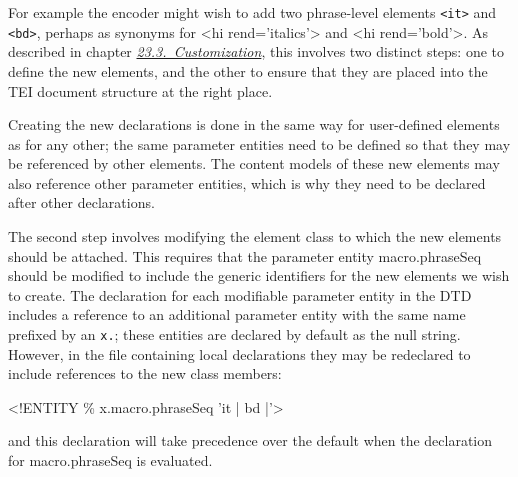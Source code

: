 For example the encoder might wish to add two phrase-level elements \texttt{<it>} and \texttt{<bd>}, perhaps as synonyms for <hi rend='italics'> and <hi rend='bold'>. As described in chapter \textit{\hyperref[MD]{23.3.\ Customization}}, this involves two distinct steps: one to define the new elements, and the other to ensure that they are placed into the TEI document structure at the right place.\par
Creating the new declarations is done in the same way for user-defined elements as for any other; the same parameter entities need to be defined so that they may be referenced by other elements. The content models of these new elements may also reference other parameter entities, which is why they need to be declared after other declarations. \par
The second step involves modifying the element class to which the new elements should be attached. This requires that the parameter entity \textsf{macro.phraseSeq} should be modified to include the generic identifiers for the new elements we wish to create. The declaration for each modifiable parameter entity in the DTD includes a reference to an additional parameter entity with the same name prefixed by an \texttt{x.}; these entities are declared by default as the null string. However, in the file containing local declarations they may be redeclared to include references to the new class members: \par\hfill\bgroup\exampleFont\vskip 10pt\begin{shaded}
\obeyspaces <!ENTITY \% x.macro.phraseSeq 'it | bd |'>\end{shaded}
\par\egroup 
 and this declaration will take precedence over the default when the declaration for macro.phraseSeq is evaluated.
